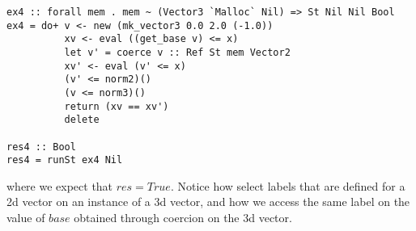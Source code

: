 \begin{lstlisting}
ex4 :: forall mem . mem ~ (Vector3 `Malloc` Nil) => St Nil Nil Bool
ex4 = do+ v <- new (mk_vector3 0.0 2.0 (-1.0))
          xv <- eval ((get_base v) <= x)
          let v' = coerce v :: Ref St mem Vector2
          xv' <- eval (v' <= x)
          (v' <= norm2)()
          (v <= norm3)()
          return (xv == xv')
          delete

res4 :: Bool
res4 = runSt ex4 Nil
\end{lstlisting}

where we expect that $res=True$. Notice how select labels that are defined for a 2d vector on an instance of a 3d vector, and how we access the same label on the value of $base$ obtained through coercion on the 3d vector.

